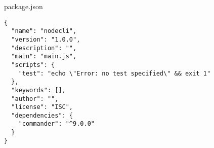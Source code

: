 \begin{listtitle}
package.json
\end{listtitle}
\begin{lstlisting}
{
  "name": "nodecli",
  "version": "1.0.0",
  "description": "",
  "main": "main.js",
  "scripts": {
    "test": "echo \"Error: no test specified\" && exit 1"
  },
  "keywords": [],
  "author": "",
  "license": "ISC",
  "dependencies": {
    "commander": "^9.0.0"
  }
}
\end{lstlisting}
\listend
